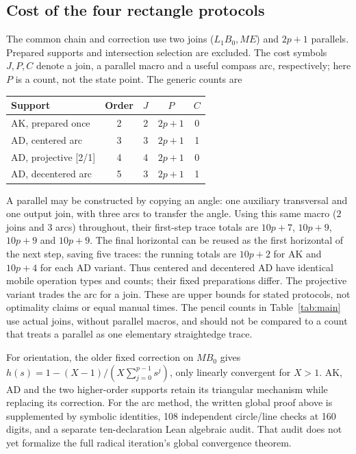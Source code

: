 \documentclass[11pt,a4paper]{article}
\theoremstyle{remark}\newtheorem{remark}[theorem]{Remark}
\begin{document}
\subsection{Cost of the four rectangle protocols}
The common chain and correction use two joins ($L_1B_0,ME$) and $2p+1$ parallels. Prepared supports and intersection selection are excluded. The cost symbols $J,P,C$ denote a join, a parallel macro and a useful compass arc, respectively; here $P$ is a count, not the state point. The generic counts are
\begin{center}\small
\begin{tabular}{@{}lcccc@{}}\toprule
Support & Order & $J$ & $P$ & $C$\\\midrule
AK, prepared once & 2 & 2 & $2p+1$ & 0\\
AD, centered arc & 3 & 3 & $2p+1$ & 1\\
AD, projective [2/1] & 4 & 4 & $2p+1$ & 0\\
AD, decentered arc & 5 & 3 & $2p+1$ & 1\\\bottomrule
\end{tabular}
\end{center}
A parallel may be constructed by copying an angle: one auxiliary transversal and one output join, with three arcs to transfer the angle. Using this same macro ($2$ joins and $3$ arcs) throughout, their first-step trace totals are $10p+7$, $10p+9$, $10p+9$ and $10p+9$. The final horizontal can be reused as the first horizontal of the next step, saving five traces: the running totals are $10p+2$ for AK and $10p+4$ for each AD variant. Thus centered and decentered AD have identical mobile operation types and counts; their fixed preparations differ. The projective variant trades the arc for a join. These are upper bounds for stated protocols, not optimality claims or equal manual times. The pencil counts in Table~\ref{tab:main} use actual joins, without parallel macros, and should not be compared to a count that treats a parallel as one elementary straightedge trace.

For orientation, the older fixed correction on $MB_0$ gives $h(s)=1-(X-1)/(X\sum_{j=0}^{p-1}s^j)$, only linearly convergent for $X>1$. AK, AD and the two higher-order supports retain its triangular mechanism while replacing its correction. For the arc method, the written global proof above is supplemented by symbolic identities, 108 independent circle/line checks at 160 digits, and a separate ten-declaration Lean algebraic audit. That audit does not yet formalize the full radical iteration's global convergence theorem.
\end{document}

